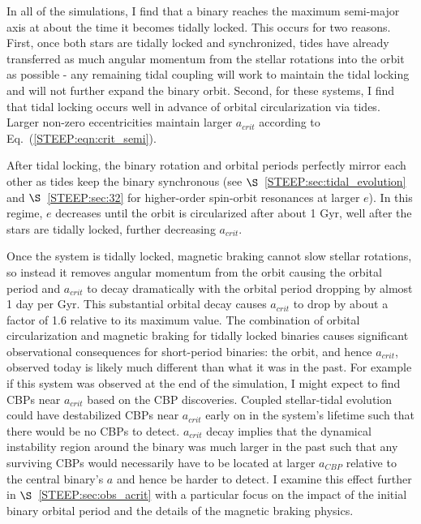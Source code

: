 In all of the simulations, I find that a binary reaches the maximum semi-major axis at about the time it becomes tidally locked.  This occurs for two reasons.  First, once both stars are tidally locked and synchronized, tides have already transferred as much angular momentum from the stellar rotations into the orbit as possible - any remaining tidal coupling will work to maintain the tidal locking and will not further expand the binary orbit.  Second, for these systems, I find that tidal locking occurs well in advance of orbital circularization via tides.  Larger non-zero eccentricities maintain larger $a_{crit}$ according to Eq.~(\ref{STEEP:eqn:crit_semi}). 

After tidal locking, the binary rotation and orbital periods perfectly mirror each other as tides keep the binary synchronous (see $\S$~\ref{STEEP:sec:tidal_evolution} and $\S$~\ref{STEEP:sec:32} for higher-order spin-orbit resonances at larger $e$).  In this regime, $e$ decreases until the orbit is circularized after about 1 Gyr, well after the stars are tidally locked, further decreasing $a_{crit}$.

Once the system is tidally locked, magnetic braking cannot slow stellar rotations, so instead it removes angular momentum from the orbit causing the orbital period and $a_{crit}$ to decay dramatically with the orbital period dropping by almost 1 day per Gyr.  This substantial orbital decay causes $a_{crit}$ to drop by about a factor of 1.6 relative to its maximum value.  The combination of orbital circularization and magnetic braking for tidally locked binaries causes significant observational consequences for short-period binaries: the orbit, and hence $a_{crit}$, observed today is likely much different than what it was in the past.  For example if this system was observed at the end of the simulation, I might expect to find CBPs near $a_{crit}$ based on the \kepler CBP discoveries.  Coupled stellar-tidal evolution could have destabilized CBPs near $a_{crit}$ early on in the system's lifetime such that there would be no CBPs to detect.  $a_{crit}$ decay implies that the dynamical instability region around the binary was much larger in the past such that any surviving CBPs would necessarily have to be located at larger $a_{CBP}$ relative to the central binary's $a$ and hence be harder to detect.  I examine this effect further in $\S$~\ref{STEEP:sec:obs_acrit} with a particular focus on the impact of the initial binary orbital period and the details of the magnetic braking physics.

